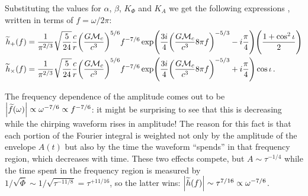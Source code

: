\documentclass[main.tex]{subfiles}
\begin{document}
Substituting the values for \(\alpha \), \(\beta \), \(K_\Phi \) and \(K_A\) we get the following expressions \cite[eqs.\ 4.34--37]{maggioreGravitationalWavesVolume2007}, written in terms of \(f = \omega / 2\pi \): 
%
\begin{align} \label{eq:spa-waveforms}
\widetilde{h}_{+}(f) &= \frac{1}{\pi^{2/3}} \sqrt{ \frac{5}{24}} 
\frac{c}{r} \qty( \frac{G \mathcal{M}_c}{c^3})^{5/6} f^{-7/6} 
\exp(\frac{3i}{4} \qty(\frac{G \mathcal{M}_c}{c^3} 8 \pi f)^{-5/3} - i \frac{\pi}{4})
\qty( \frac{1 + \cos^2\iota }{2}) 
\\
\widetilde{h}_{ \times }(f) &= \frac{1}{\pi^{2/3}} \sqrt{ \frac{5}{24}} 
\frac{c}{r} \qty( \frac{G \mathcal{M}_c}{c^3})^{5/6} f^{-7/6} 
\exp(\frac{3i}{4} \qty(\frac{G \mathcal{M}_c}{c^3} 8 \pi f)^{-5/3} + i \frac{\pi}{4})
\cos \iota 
\,.
\end{align}

The frequency dependence of the amplitude comes out to be \(\abs{\widetilde{f}(\omega )} \propto \omega^{-7/6} \propto f^{-7/6}\):  it might be surprising to see that this is decreasing while the chirping waveform rises in amplitude! 
The reason for this fact is that each portion of the Fourier integral is weighted not only by the amplitude of the envelope \(A(t)\) but also by the time the waveform ``spends'' in that frequency region, which decreases with time. 
These two effects compete, but \(A \sim \tau^{-1/4}\) while the time spent in the frequency region is measured by \(1/ \sqrt{\ddot{\Phi}} \sim 1/ \sqrt{\tau^{-11/8}} = \tau^{+11/16}\), so the latter wins: \(\abs{\widetilde{h}(f)} \sim \tau^{7/16} \propto \omega^{-7/6}\). 
\end{document}
